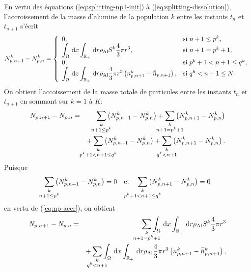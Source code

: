 En vertu des équations (\ref{eq:splitting-np1-init}) à
(\ref{eq:splitting-dissolution}), l'accroissement de la masse d'alumine
de la population $k$ entre les instants $t_{n}$ et $t_{n + 1}$ s'écrit
\begin{equation}\label{eq:np-accr}
  N_{p,n+1}^k - N_{p,n}^k = \left\{
  \begin{array}{ll}
    0, & \text{si }n+1 \leq p^k, \\
    \displaystyle\int_\Omega\,\mathrm dx\displaystyle\int_{\mathbb R_+}\,\mathrm dr \rho_\mathrm{Al} S^k\frac{4}{3}\pi
    r^3, & \text{si }n+1 = p^k + 1, \\
    0, & \text{si }p^k+1 < n+1 \leq q^k, \\
    \displaystyle\int_\Omega\,\mathrm dx\displaystyle\int_{\mathbb R_+}\,\mathrm dr \rho_\mathrm{Al} \frac{4}{3}\pi
    r^3\left( n_{p,n+1}^k - \bar{\bar n}_{p,n+1} \right), &\text{si } q^k < n+1 \leq N.
  \end{array}
  \right.
\end{equation}
On obtient l'accoissement de la masse totale de particules entre les
instants $t_n$ et $t_{n+1}$ en sommant sur $k = 1$ à $K$:
\begin{eqnarray*}
  N_{p,n+1} - N_{p,n}
  &=& \sum_{\mathclap{\substack{k\\ n+1 \leq p^k}}} \parent{N_{p,n+1}^k - N_{p,n}^k} %
  + \sum_{\mathclap{\substack{k\\ n+1 = p^k + 1}}} \parent{N_{p,n+1}^k - N_{p,n}^k}\\
  && + \sum_{\mathclap{\substack{k\\ p^k + 1 < n+1 \leq q^k}}} \parent{N_{p,n+1}^k - N_{p,n}^k} %
  + \sum_{\mathclap{\substack{k\\ q^k < n+1}}} \parent{N_{p,n+1}^k -
    N_{p,n}^k}.
\end{eqnarray*}
Puisque
\begin{equation*}
\sum_{\mathclap{\substack{k\\ n+1 \leq p^k}}} \parent{N_{p,n+1}^k - N_{p,n}^k} = 0 \quad \text{et}\quad \sum_{\mathclap{\substack{k\\ p^k + 1 < n+1 \leq q^k}}} \parent{N_{p,n+1}^k - N_{p,n}^k} = 0
\end{equation*}
en vertu de (\ref{eq:np-accr}), on obtient
\begin{eqnarray}
  N_{p,n+1} - N_{p,n}
  &=&\sum_{\mathclap{\substack{k\\ n+1 = p^k+1}}} \displaystyle\int_\Omega\intd{x}\displaystyle\int_\rplus\intd{r} \aluminadensity S^k\frac{4}{3}\pi
  r^3 \nonumber\\
  && + \sum_{\mathclap{\substack{k \\ q^k < n+1}}} \displaystyle\int_\Omega\intd{x}\displaystyle\int_\rplus \intd{r}\aluminadensity \frac{4}{3}\pi
    r^3\parent{n_{p,n+1}^k - \bar{\bar n}_{p,n+1}^k}, \label{eq:np-masse-1}
\end{eqnarray}

